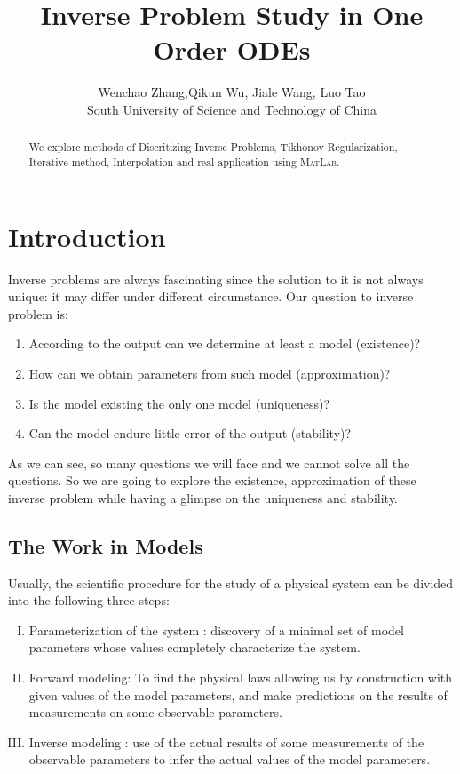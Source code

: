\documentclass[a4paper]{article}
\title{Inverse Problem Study in One Order ODEs}
\author{Wenchao Zhang,Qikun Wu, Jiale Wang, Luo Tao\\
South University of Science and Technology of China\\}
\newenvironment{enumerateromancap}{\begin{enumerate}[I.] }{\end{enumerate}}
\begin{document}
\maketitle
\tableofcontents
\newpage

\begin{abstract}
We explore methods of Discritizing Inverse Problems, Tikhonov Regularization, Iterative method, Interpolation and real application using \textsc{MatLab}.
\end{abstract}


\section{Introduction}


Inverse problems are always fascinating since the solution to it is not always unique: it may differ under different circumstance. Our question to inverse problem is:{\cite{IPMS}}\\
\begin{enumerate}
  \item According to the output can we determine at least a model (existence)?
  \item How can we obtain parameters from such model (approximation)?
  \item Is the model existing the only one model (uniqueness)?
  \item Can the model endure little error of the output (stability)?
\end{enumerate}
As we can see, so many questions we will face and we cannot solve all the questions. So we are going to explore the existence, approximation of these inverse problem while having a glimpse on the uniqueness and stability.


\subsection{The Work in Models}


Usually, the scientific procedure for the study of a physical system can be
divided into the following three steps{\cite{1}}:
\begin{enumerateromancap}
  \item Parameterization of the system : discovery of a minimal set of model
  parameters whose values completely characterize the system.

  \item Forward modeling: To find the physical laws allowing us by
  construction with given values of the model parameters, and make predictions
  on the results of measurements on some observable parameters.

  \item Inverse modeling : use of the actual results of some measurements of
  the observable parameters to infer the actual values of the model
  parameters.
\end{enumerateromancap}
\end{document}
